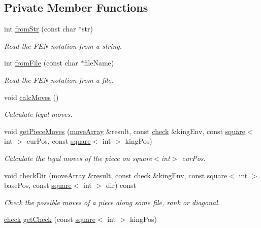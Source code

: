 \subsection*{Private Member Functions}
\begin{DoxyCompactItemize}
\item 
int \hyperlink{classBoard_a49045c77d568e4b5a00f176a2add54c8}{from\+Str} (const char $\ast$str)
\begin{DoxyCompactList}\small\item\em Read the F\+EN notation from a string. \end{DoxyCompactList}\item 
int \hyperlink{classBoard_a4043087fc35e9706d0e83ec07225fe33}{from\+File} (const char $\ast$file\+Name)
\begin{DoxyCompactList}\small\item\em Read the F\+EN notation from a file. \end{DoxyCompactList}\item 
void \hyperlink{classBoard_ad4d3ebb2342b74d9455a89924a54aa14}{calc\+Moves} ()
\begin{DoxyCompactList}\small\item\em Calculate legal moves. \end{DoxyCompactList}\item 
void \hyperlink{classBoard_aa70526dde51ab18ec4011c07a7e38e60}{get\+Piece\+Moves} (\hyperlink{structmoveArray}{move\+Array} \&result, const \hyperlink{structcheck}{check} \&king\+Env, const \hyperlink{structsquare}{square}$<$ int $>$ cur\+Pos, const \hyperlink{structsquare}{square}$<$ int $>$ king\+Pos)
\begin{DoxyCompactList}\small\item\em Calculate the legal moves of the piece on square$<$int$>$ cur\+Pos. \end{DoxyCompactList}\item 
void \hyperlink{classBoard_ab63f400e8fdd7d1747c18642b59cc435}{check\+Dir} (\hyperlink{structmoveArray}{move\+Array} \&result, const \hyperlink{structcheck}{check} \&king\+Env, const \hyperlink{structsquare}{square}$<$ int $>$ base\+Pos, const \hyperlink{structsquare}{square}$<$ int $>$ dir) const
\begin{DoxyCompactList}\small\item\em Check the possible moves of a piece along some file, rank or diagonal. \end{DoxyCompactList}\item 
\hyperlink{structcheck}{check} \hyperlink{classBoard_afc291baf2c205a64255e8e55ffeff004}{get\+Check} (const \hyperlink{structsquare}{square}$<$ int $>$ king\+Pos)

\end{DoxyCompactItemize}
